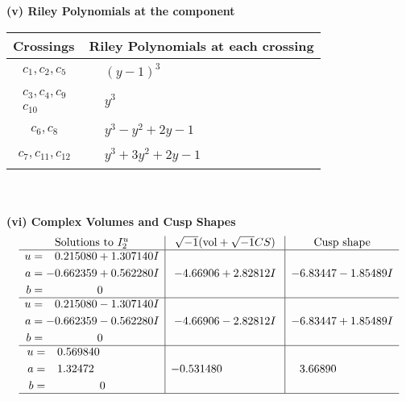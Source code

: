 \documentclass[1p]{elsarticle_modified}
\theoremstyle{definition}
\newcommand{\I}{\sqrt{-1}}
\begin{document}
\newpage\renewcommand{\arraystretch}{1}
\flushleft \textbf{(v) Riley Polynomials at the component}\newline \\
\begin{tabular}{m{50pt}|m{274pt}}
Crossings & \hspace{64pt}Riley Polynomials at each crossing \\
\hline $$\begin{aligned}c_{1},c_{2},c_{5}\end{aligned}$$&$\begin{aligned}
&(y-1)^3
\end{aligned}$\\
\hline $$\begin{aligned}c_{3},c_{4},c_{9}\\c_{10}\end{aligned}$$&$\begin{aligned}
&y^3
\end{aligned}$\\
\hline $$\begin{aligned}c_{6},c_{8}\end{aligned}$$&$\begin{aligned}
&y^3- y^2+2 y-1
\end{aligned}$\\
\hline $$\begin{aligned}c_{7},c_{11},c_{12}\end{aligned}$$&$\begin{aligned}
&y^3+3 y^2+2 y-1
\end{aligned}$\\
\hline
\end{tabular}\\~\\
\newpage\flushleft \textbf{(vi) Complex Volumes and Cusp Shapes}
$$\begin{array}{c|c|c}  
\text{Solutions to }I^u_{2}& \I (\text{vol} + \sqrt{-1}CS) & \text{Cusp shape}\\
 \hline 
\begin{aligned}
u &= \phantom{-}0.215080 + 1.307140 I \\
a &= -0.662359 + 0.562280 I \\
b &= \phantom{-0.000000 } 0\end{aligned}
 & -4.66906 + 2.82812 I & -6.83447 - 1.85489 I \\ \hline\begin{aligned}
u &= \phantom{-}0.215080 - 1.307140 I \\
a &= -0.662359 - 0.562280 I \\
b &= \phantom{-0.000000 } 0\end{aligned}
 & -4.66906 - 2.82812 I & -6.83447 + 1.85489 I \\ \hline\begin{aligned}
u &= \phantom{-}0.569840\phantom{ +0.000000I} \\
a &= \phantom{-}1.32472\phantom{ +0.000000I} \\
b &= \phantom{-0.000000 } 0\end{aligned}
 & -0.531480\phantom{ +0.000000I} & \phantom{-}3.66890\phantom{ +0.000000I}\\
 \hline 
 \end{array}$$\newpage\newpage\renewcommand{\arraystretch}{1}
\end{document}
